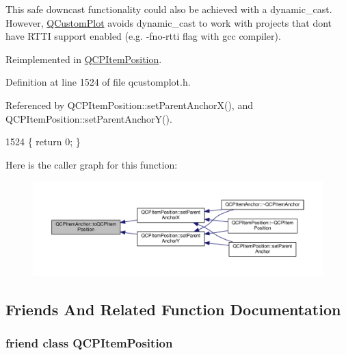 This safe downcast functionality could also be achieved with a dynamic\+\_\+cast. However, \hyperlink{class_q_custom_plot}{Q\+Custom\+Plot} avoids dynamic\+\_\+cast to work with projects that don\textquotesingle{}t have R\+T\+T\+I support enabled (e.\+g. -\/fno-\/rtti flag with gcc compiler). 

Reimplemented in \hyperlink{class_q_c_p_item_position_a577a7efc601df85a20b3e709d1ac320e}{Q\+C\+P\+Item\+Position}.



Definition at line 1524 of file qcustomplot.\+h.



Referenced by Q\+C\+P\+Item\+Position\+::set\+Parent\+Anchor\+X(), and Q\+C\+P\+Item\+Position\+::set\+Parent\+Anchor\+Y().


\begin{DoxyCode}
1524 \{ \textcolor{keywordflow}{return} 0; \}
\end{DoxyCode}


Here is the caller graph for this function\+:\nopagebreak
\begin{figure}[H]
\begin{center}
\leavevmode
\includegraphics[width=350pt]{class_q_c_p_item_anchor_ac54b20120669950255a63587193dbb86_icgraph}
\end{center}
\end{figure}




\subsection{Friends And Related Function Documentation}
\hypertarget{class_q_c_p_item_anchor_aa9b8ddc062778e202a0be06a57d18d17}{}
\subsubsection[{Q\+C\+P\+Item\+Position}]{\setlength{\rightskip}{0pt plus 5cm}friend class {\bf Q\+C\+P\+Item\+Position}\hspace{0.3cm}{\ttfamily [friend]}}\label{class_q_c_p_item_anchor_aa9b8ddc062778e202a0be06a57d18d17}


